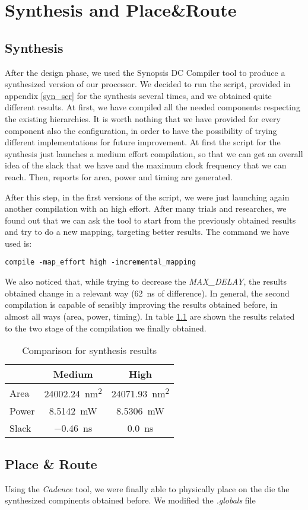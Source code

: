 \chapter{Synthesis and Place\&Route}
\label{chap_synth}

\section{Synthesis}
After the design phase, we used the Synopsis DC Compiler tool to produce a synthesized version of our \dlx processor. We decided to run the script, provided in appendix \ref{syn_scr} for the synthesis several times, and we obtained quite different results.
At first, we have compiled all the needed components respecting the existing hierarchies. It is worth nothing that we have provided for every component also the configuration, in order to have the possibility of trying different implementations for future improvement. At first the script for the synthesis just launches a medium effort compilation, so that we can get an overall idea of the slack that we have and the maximum clock frequency that we can reach. 
Then, reports for area, power and timing are generated.

After this step, in the first versions of the script, we were just launching again another compilation with an high effort. After many trials and researches, we found out that we can ask the tool to start from the previously obtained results and try to do a new mapping, targeting better results. The command we have used is:
\begin{lstlisting}[style=B]
	compile -map_effort high -incremental_mapping
\end{lstlisting}

We also noticed that, while trying to decrease the \textit{MAX\_DELAY}, the results obtained change in a relevant way (\SI{62}{\nano\second} of difference). In general, the second compilation is capable of sensibly improving the results obtained before, in almost all ways (area, power, timing). In table \ref{tab_rep} are shown the results related to the two stage of the compilation we finally obtained.

\begin{table}[]
	\centering
	\begin{tabular}{l|cc}
		\toprule
				& Medium  						& High  								\\
		\midrule
		Area	& \SI{24002.24}{\nano\meter^2}	&  	\SI{24071.93}{\nano\meter^2}		\\
		Power	& \SI{8.5142}{\milli\watt}		&  	\SI{8.5306}{\milli\watt}			\\
		Slack	& \SI{-0.46}{\nano\second}		&	\SI{0.0}{\nano\second}				\\ 
		\bottomrule
	\end{tabular}
\caption{Comparison for synthesis results}
\label{tab_rep}
\end{table}

\section{Place \& Route}

Using the \textit{Cadence} tool, we were finally able to physically place on the die the synthesized compinents obtained before. We modified the \textit{.globals} file